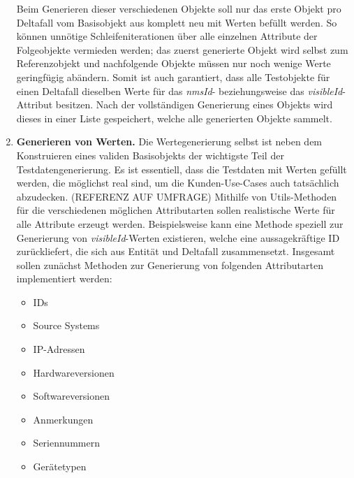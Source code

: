 \begin{enumerate}
    Beim Generieren dieser verschiedenen Objekte soll nur das erste Objekt pro Deltafall vom Basisobjekt aus komplett neu mit Werten befüllt werden. So können unnötige Schleifeniterationen über alle einzelnen Attribute der Folgeobjekte vermieden werden; das zuerst generierte Objekt wird selbst zum Referenzobjekt und nachfolgende Objekte müssen nur noch wenige Werte geringfügig abändern. Somit ist auch garantiert, dass alle Testobjekte für einen Deltafall dieselben Werte für das \textit{nmsId}- beziehungsweise das \textit{visibleId}-Attribut besitzen. Nach der vollständigen Generierung eines Objekts wird dieses in einer Liste gespeichert, welche alle generierten Objekte sammelt.
    \item \textbf{Generieren von Werten.} Die Wertegenerierung selbst ist neben dem Konstruieren eines validen Basisobjekts der wichtigste Teil der Testdatengenerierung. Es ist essentiell, dass die Testdaten mit Werten gefüllt werden, die möglichst real sind, um die Kunden-Use-Cases auch tatsächlich abzudecken. (REFERENZ AUF UMFRAGE) Mithilfe von Utils-Methoden für die verschiedenen möglichen Attributarten sollen realistische Werte für alle Attribute erzeugt werden. Beispielsweise kann eine Methode speziell zur Generierung von \textit{visibleId}-Werten existieren, welche eine aussagekräftige ID zurückliefert, die sich aus Entität und Deltafall zusammensetzt. Insgesamt sollen zunächst Methoden zur Generierung von folgenden Attributarten implementiert werden:
    \begin{itemize}
        \item IDs
        \item Source Systems
        \item IP-Adressen
        \item Hardwareversionen
        \item Softwareversionen
        \item Anmerkungen
        \item Seriennummern
        \item Gerätetypen
    \end{itemize}


\end{enumerate}
